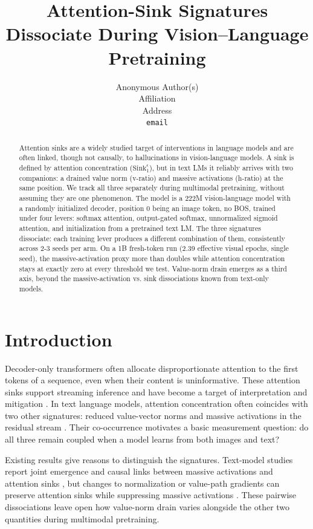 \documentclass{article}
\title{Attention-Sink Signatures Dissociate During Vision--Language Pretraining}
\author{  Anonymous Author(s) \\
  Affiliation \\
  Address \\
  \texttt{email} \\
}
\begin{document}
\maketitle


\begin{abstract}
Attention sinks are a widely studied target of interventions in language models and are often linked, though not causally, to hallucinations in vision-language models. A sink is defined by attention concentration ($\mathrm{Sink}^{\epsilon}_{1}$), but in text LMs it reliably arrives with two companions: a drained value norm (v-ratio) and massive activations (h-ratio) at the same position. We track all three separately during multimodal pretraining, without assuming they are one phenomenon. The model is a 222M vision-language model with a randomly initialized decoder, position 0 being an image token, no BOS, trained under four levers: softmax attention, output-gated softmax, unnormalized sigmoid attention, and initialization from a pretrained text LM. The three signatures dissociate: each training lever produces a different combination of them, consistently across 2-3 seeds per arm. On a 1B fresh-token run (2.39 effective visual epochs, single seed), the massive-activation proxy more than doubles while attention concentration stays at exactly zero at every threshold we test. Value-norm drain emerges as a third axis, beyond the massive-activation vs. sink dissociations known from text-only models.
\end{abstract}


\section{Introduction}

Decoder-only transformers often allocate disproportionate attention to the first tokens of a sequence, even when their content is uninformative. These attention sinks support streaming inference \cite{ref1} and have become a target of interpretation and mitigation \cite{ref3}. In text language models, attention concentration often coincides with two other signatures: reduced value-vector norms \cite{ref4,ref6} and massive activations in the residual stream \cite{ref2,ref5}. Their co-occurrence motivates a basic measurement question: do all three remain coupled when a model learns from both images and text?

Existing results give reasons to distinguish the signatures. Text-model studies report joint emergence and causal links between massive activations and attention sinks \cite{ref7,ref8}, but changes to normalization or value-path gradients can preserve attention sinks while suppressing massive activations \cite{ref9,ref10}. These pairwise dissociations leave open how value-norm drain varies alongside the other two quantities during multimodal pretraining.
\end{document}
